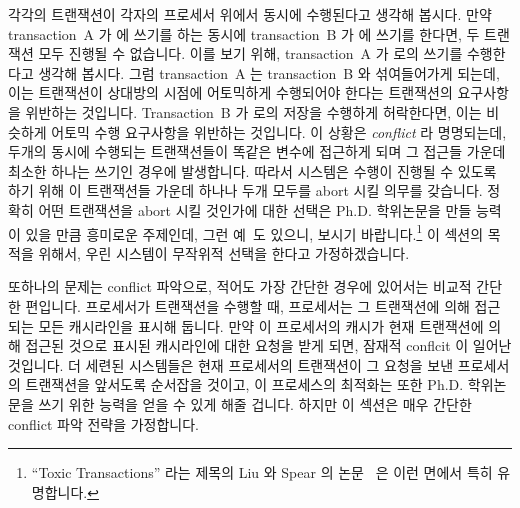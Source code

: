 각각의 트랜잭션이 각자의 프로세서 위에서 동시에 수행된다고 생각해 봅시다.
만약 transaction~A 가  에 쓰기를 하는 동시에 transaction~B 가  에
쓰기를 한다면, 두 트랜잭션 모두 진행될 수 없습니다.
이를 보기 위해, transaction~A 가  로의 쓰기를 수행한다고 생각해 봅시다.
그럼 transaction~A 는 transaction~B 와 섞여들어가게 되는데, 이는 트랜잭션이
상대방의 시점에 어토믹하게 수행되어야 한다는 트랜잭션의 요구사항을 위반하는
것입니다.
Transaction~B 가  로의 저장을 수행하게 허락한다면, 이는 비슷하게 어토믹
수행 요구사항을 위반하는 것입니다.
이 상황은 \emph{conflict} 라 명명되는데, 두개의 동시에 수행되는 트랜잭션들이
똑같은 변수에 접근하게 되며 그 접근들 가운데 최소한 하나는 쓰기인 경우에
발생합니다.
따라서 시스템은 수행이 진행될 수 있도록 하기 위해 이 트랜잭션들 가운데 하나나
두개 모두를 abort 시킬 의무를 갖습니다.
정확히 어떤 트랜잭션을 abort 시킬 것인가에 대한 선택은 Ph.D. 학위논문을 만들
능력이 있을 만큼 흥미로운 주제인데, 그런 예~\cite{EgeAkpinar2011HTM2TLE}도
있으니, 보시기 바랍니다.\footnote{
	``Toxic Transactions'' 라는 제목의 Liu 와 Spear 의
	논문~\cite{YujieLiu2011ToxicTransactions}  은 이런 면에서 특히
	유명합니다.}
이 섹션의 목적을 위해서, 우린 시스템이 무작위적 선택을 한다고 가정하겠습니다.
\iffalse

Suppose that each transaction executes concurrently on its own processor.
If transaction~A stores to \co{x} at the same time that transaction~B
stores to \co{y}, neither transaction can progress.
To see this, suppose that transaction~A executes its store to \co{y}.
Then transaction~A will be interleaved within transaction~B, in violation
of the requirement that transactions execute atomically with respect to
each other.
Allowing transaction~B to execute its store to \co{x} similarly violates
the atomic-execution requirement.
This situation is termed a \emph{conflict}, which happens whenever two
concurrent transactions access the same variable where at least one of
the accesses is a store.
The system is therefore obligated to abort one or both of the transactions
in order to allow execution to progress.
The choice of exactly which transaction to abort is an interesting topic
that will very likely retain the ability to generate Ph.D. dissertations for
some time to come, see for
example~\cite{EgeAkpinar2011HTM2TLE}.\footnote{
	Liu's and Spear's paper entitled ``Toxic
	Transactions''~\cite{YujieLiu2011ToxicTransactions} is
	particularly instructive in this regard.}
For the purposes of this section, we can assume that the system makes
a random choice.
\fi

또하나의 문제는 conflict 파악으로, 적어도 가장 간단한 경우에 있어서는 비교적
간단한 편입니다.
프로세서가 트랜잭션을 수행할 때, 프로세서는 그 트랜잭션에 의해 접근되는 모든
캐시라인을 표시해 둡니다.
만약 이 프로세서의 캐시가 현재 트랜잭션에 의해 접근된 것으로 표시된 캐시라인에
대한 요청을 받게 되면, 잠재적 conflcit 이 일어난 것입니다.
더 세련된 시스템들은 현재 프로세서의 트랜잭션이 그 요청을 보낸 프로세서의
트랜잭션을 앞서도록 순서잡을 것이고, 이 프로세스의 최적화는 또한 Ph.D.
학위논문을 쓰기 위한 능력을 얻을 수 있게 해줄 겁니다.
하지만 이 섹션은 매우 간단한 conflict 파악 전략을 가정합니다.
\iffalse

